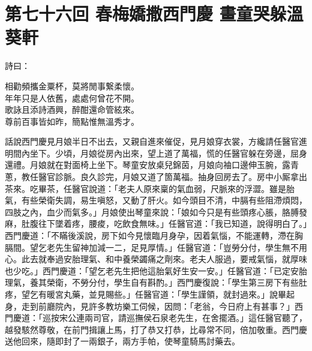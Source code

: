 
\chapter*{第七十六回 春梅嬌撒西門慶 畫童哭躲溫葵軒}


詩曰：

\begin{myquote} 
相勸頻攜金粟杯，莫將閒事繋柔懷。\\年年只是人依舊，處處何曾花不開。\\歌詠且添詩酒興，醉酣還命管絃來。\\尊前百事皆如昨，簡點惟無溫秀才。
\end{myquote} 

話說西門慶見月娘半日不出去，又親自進來催促，見月娘穿衣裳，方纔請任醫官進明間內坐下。{}少頃，月娘從房內出來，望上道了萬福，慌的任醫官躲在旁邊，屈身還禮。月娘就在對面椅上坐下。琴童安放桌兒錦茵，月娘向袖口邊伸玉腕，露青蔥，教任醫官診脈。良久診完，月娘又道了箇萬福。抽身回房去了。房中小厮拿出茶來。吃畢茶，任醫官說道：「老夫人原來稟的氣血弱，尺脈來的浮澀。雖是胎氣，有些榮衛失調，易生嗔怒，又動了肝火。如今頭目不清，中膈有些阻滯煩悶，四肢之內，血少而氣多。」{}月娘使出琴童來說：「娘如今只是有些頭疼心脹，胳膊發麻，肚腹往下墜着疼，腰痠，吃飲食無味。」任醫官道：「我已知道，說得明白了。」西門慶道：「不瞞後溪說，房下如今見懷臨月身孕，因着氣惱，不能運轉，滯在胸膈間。望乞老先生留神加減一二，足見厚情。」{}任醫官道：「豈勞分付，學生無不用心。此去就奉過安胎理氣、和中養榮蠲痛之劑來。老夫人服過，要戒氣惱，{}就厚味也少吃。」西門慶道：「望乞老先生把他這胎氣好生安一安。」任醫官道：「已定安胎理氣，養其榮衛，不勞分付，學生自有斟酌。」西門慶復說：「學生第三房下有些肚疼，望乞有暖宮丸藥，並見賜些。」任醫官道：「學生謹領，就封過來。」說畢起身，走到前廳院內，見許多教坊樂工伺候，因問：「老翁，今日府上有甚事？」西門慶道：「巡按宋公連兩司官，請巡撫侯石泉老先生，在舍擺酒。」這任醫官聽了，越發駭然尊敬，在前門揖讓上馬，打了恭又打恭，比尋常不同，倍加敬重。西門慶送他回來，隨即封了一兩銀子，兩方手帕，使琴童騎馬討藥去。

